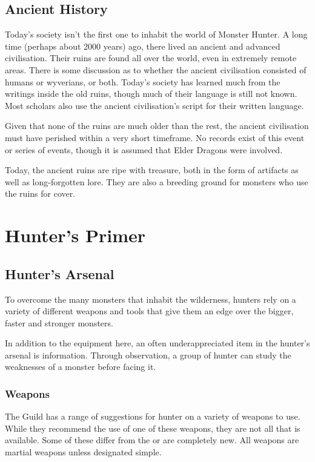 \chapter{Ancient History}
Today's society isn't the first one to inhabit the world of Monster Hunter. A long time (perhaps about 2000 years) ago, there lived an ancient and advanced civilisation. Their ruins are found all over the world, even in extremely remote areas. There is some discussion as to whether the ancient civilisation consisted of humans or wyverians, or both. Today's society has learned much from the writings inside the old ruins, though much of their language is still not known. Most scholars also use the ancient civilisation's script for their written language.

Given that none of the ruins are much older than the rest, the ancient civilisation must have perished within a very short timeframe. No records exist of this event or series of events, though it is assumed that Elder Dragons were involved.

Today, the ancient ruins are ripe with treasure, both in the form of artifacts as well as long-forgotten lore. They are also a breeding ground for monsters who use the ruins for cover.
\newpage
\hbWideBottomArtFirstPageFix


\renewcommand*{\hbPartCover}{assets/ext/stand}
\renewcommand*{\hbPartSubcover}{assets/ext/stand2}
\part{Hunter's Primer}

\chapter{Hunter's Arsenal}
To overcome the many monsters that inhabit the wilderness, hunters rely on a variety of different weapons and tools that give them an edge over the bigger, faster and stronger monsters.

In addition to the equipment here, an often underappreciated item in the hunter's arsenal is information. Through observation, a group of hunter can study the weaknesses of a monster before facing it.

\section{Weapons}
The Guild has a range of suggestions for hunter on a variety of weapons to use. While they recommend the use of one of these weapons, they are not all that is available. Some of these differ from the \PHB{} or are completely new. All weapons are martial weapons unless designated simple.

